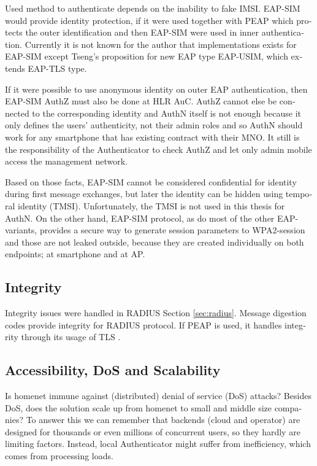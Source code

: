 \documentclass[12pt,a4paper,english]{tutthesis}
\begin{document}
\begin{otherlanguage}{english}
Used method to authenticate depends on the inability to fake IMSI.
EAP-SIM would provide identity protection, if it were used together
with PEAP which protects the outer identification  and
then EAP-SIM were used in inner authentication.
Currently it is not known for the author that implementations exists for
EAP-SIM  except Tseng's proposition \cite{tseng-usim} for  new EAP type
EAP-USIM, which extends EAP-TLS type.

If it were possible to use anonymous identity on outer EAP
authentication, then EAP-SIM AuthZ must also be done at HLR AuC.
AuthZ cannot else be connected to the corresponding
identity and AuthN itself is not enough because it only defines the users'
authenticity, not their admin roles and so 
AuthN should work for any  smartphone that has existing contract with
their MNO. 
It still is the responsibility of the Authenticator to 
check AuthZ  and let only admin mobile access the management network.









Based on those facts, EAP-SIM cannot be considered confidential for identity
during first message exchanges, but later the identity can be hidden
using temporal identity (TMSI). Unfortunately, the TMSI is not used in
this thesis for AuthN. 
On the other hand, EAP-SIM protocol, as do most of the other
EAP-variants, provides a secure way to
generate session parameters to WPA2-session and those are not leaked
outside, because they are created individually on both endpoints; 
at smartphone and at AP.
\subsection{Integrity}
\label{sec-6-5-2}
Integrity issues were handled in RADIUS Section \ref{sec:radius}.
Message digestion codes provide integrity for RADIUS protocol.
If PEAP is used, it handles integrity through its usage of TLS
\cite{peap}.

\subsection{Accessibility, DoS and Scalability}
\label{sec-6-5-3}
Is homenet immune against (distributed) denial of service (DoS)
attacks? Besides DoS, does the solution scale up from homenet to
small and middle size companies?
To answer this we can remember that backends (cloud and operator) are
designed for thousands or even millions of concurrent users, so 
they hardly are limiting factors. Instead, local
Authenticator might suffer from inefficiency, which
comes from processing loads\cite{2009-lin-simefficiency}.



\end{otherlanguage}
\end{document}
